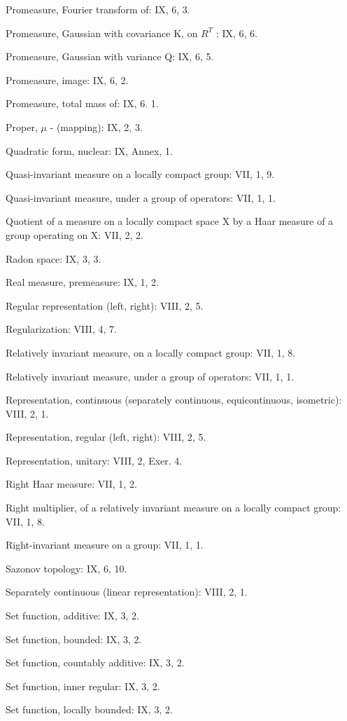 Promeasure, Fourier transform of: IX, 6, 3.

Promeasure, Gaussian with covariance K, on \(R^{T}\) : IX, 6, 6.

Promeasure, Gaussian with variance Q: IX, 6, 5.

Promeasure, image: IX, 6, 2.

Promeasure, total mass of: IX, 6. 1.

Proper, \(\mu\) - (mapping): IX, 2, 3.

Quadratic form, nuclear: IX, Annex, 1.

Quasi-invariant measure on a locally compact group: VII, 1, 9.

Quasi-invariant measure, under a group of operators: VII, 1, 1.

Quotient of a measure on a locally compact space X by a Haar measure of a group operating on X: VII, 2, 2.

Radon space: IX, 3, 3.

Real measure, premeasure: IX, 1, 2.

Regular representation (left, right): VIII, 2, 5.

Regularization: VIII, 4, 7.

Relatively invariant measure, on a locally compact group: VII, 1, 8.

Relatively invariant measure, under a group of operators: VII, 1, 1.

Representation, continuous (separately continuous, equicontinuous, isometric): VIII, 2, 1.

Representation, regular (left, right): VIII, 2, 5.

Representation, unitary: VIII, 2, Exer. 4.

Right Haar measure: VII, 1, 2.

Right multiplier, of a relatively invariant measure on a locally compact group: VII, 1, 8.

Right-invariant measure on a group: VII, 1, 1.

Sazonov topology: IX, 6, 10.

Separately continuous (linear representation): VIII, 2, 1.

Set function, additive: IX, 3, 2.

Set function, bounded: IX, 3, 2.

Set function, countably additive: IX, 3, 2.

Set function, inner regular: IX, 3, 2.

Set function, locally bounded: IX, 3, 2.

